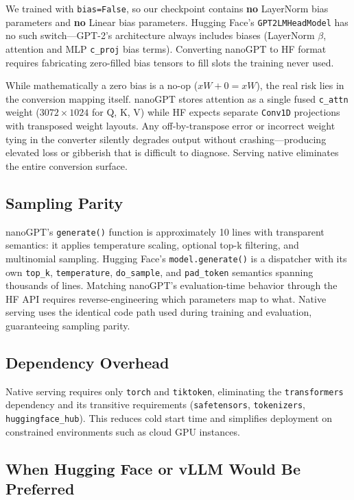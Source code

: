 \documentclass[12pt]{article}
\begin{document}
We trained with \texttt{bias=False}, so our checkpoint contains \textbf{no} LayerNorm bias parameters and \textbf{no} Linear bias parameters. Hugging Face's \texttt{GPT2LMHeadModel} has no such switch---GPT-2's architecture always includes biases (LayerNorm $\beta$, attention and MLP \texttt{c\_proj} bias terms). Converting nanoGPT to HF format requires fabricating zero-filled bias tensors to fill slots the training never used.

While mathematically a zero bias is a no-op ($xW + 0 = xW$), the real risk lies in the conversion mapping itself. nanoGPT stores attention as a single fused \texttt{c\_attn} weight ($3072 \times 1024$ for Q, K, V) while HF expects separate \texttt{Conv1D} projections with transposed weight layouts. Any off-by-transpose error or incorrect weight tying in the converter silently degrades output without crashing---producing elevated loss or gibberish that is difficult to diagnose. Serving native eliminates the entire conversion surface.

\subsection{Sampling Parity}

nanoGPT's \texttt{generate()} function is approximately 10 lines with transparent semantics: it applies temperature scaling, optional top-k filtering, and multinomial sampling. Hugging Face's \texttt{model.generate()} is a dispatcher with its own \texttt{top\_k}, \texttt{temperature}, \texttt{do\_sample}, and \texttt{pad\_token} semantics spanning thousands of lines. Matching nanoGPT's evaluation-time behavior through the HF API requires reverse-engineering which parameters map to what. Native serving uses the identical code path used during training and evaluation, guaranteeing sampling parity.

\subsection{Dependency Overhead}

Native serving requires only \texttt{torch} and \texttt{tiktoken}, eliminating the \texttt{transformers} dependency and its transitive requirements (\texttt{safetensors}, \texttt{tokenizers}, \texttt{huggingface\_hub}). This reduces cold start time and simplifies deployment on constrained environments such as cloud GPU instances.

\subsection{When Hugging Face or vLLM Would Be Preferred}
\end{document}
